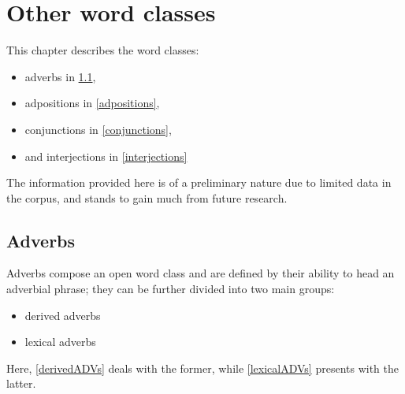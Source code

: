

\chapter{Other word classes}\label{otherWordClasses}
This chapter describes the word classes:
\begin{itemize}
\item{adverbs in \SEC\ref{adverbs},}
\item{adpositions in \SEC\ref{adpositions},}
\item{conjunctions in \SEC\ref{conjunctions},}
\item{and interjections in \SEC\ref{interjections}}
\end{itemize}
The information provided here is of a preliminary nature due to limited data in the corpus, and stands to gain much from future research. %

\vfill

\section{Adverbs}\label{adverbs}
Adverbs compose an open word class and are defined by their ability to head an adverbial phrase; they can be further divided into two main groups: 
\begin{itemize}
\item{derived adverbs}
\item{lexical adverbs}
\end{itemize}
Here, \SEC\ref{derivedADVs} deals with the former, while \SEC\ref{lexicalADVs} presents with the latter. 

\vfill
\pagebreak

